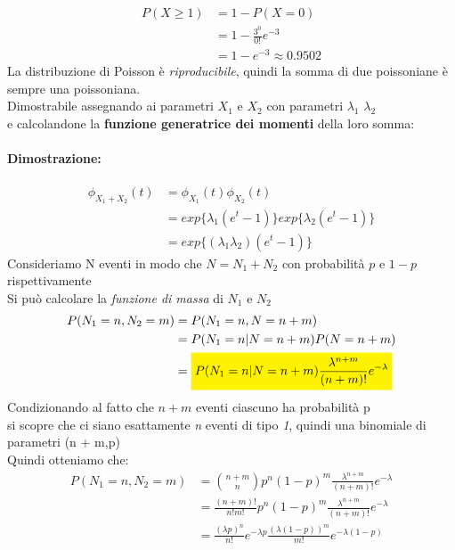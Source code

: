\documentclass[]{article}
\newcommand{\highlight}[1]{\colorbox{yellow}{$\displaystyle #1$}}
\begin{document}
    \begin{equation*}
        \begin{split}
            P(X \geq 1) &= 1 - P(X = 0)\\
            & = 1 - \frac{3^0}{0!} e^{-3} \\
            & = 1 - e^{-3} \approx 0.9502
        \end{split}
    \end{equation*}
    La distribuzione di Poisson è \textit{riproducibile}, quindi la somma di due poissoniane è sempre una poissoniana. \\
    Dimostrabile assegnando ai parametri $X_1$ e $X_2$ con parametri $\lambda_1$ $\lambda_2$ \\
    e calcolandone la \textbf{funzione generatrice dei momenti} della loro somma:
    \paragraph{Dimostrazione:}
    \begin{equation*}
        \begin{split}
            \phi_{X_1 + X_2} (t) & = \phi_{X_1}(t) \phi_{X_2}(t) \\
            & = exp\{\lambda_1 (e^t - 1)\} exp\{\lambda_2 (e^t - 1)\} \\
            & = exp\{(\lambda_1 \lambda_2) (e^t - 1)\}
        \end{split}
    \end{equation*}
    Consideriamo N eventi in modo che $N = N_1 + N_2$ con probabilità $p$ e $1 - p$ rispettivamente \\
    Si può calcolare la \textit{funzione di massa} di $N_1$ e $N_2$
    \begin{equation*}
        \begin{split}
            P(N_1 = n, N_2 = m) &= P(N_1 = n, N = n+m) \\
            & = P(N_1 = n | N = n + m) P(N = n+m) \\
            & = \highlight{P(N_1 = n | N = n + m) \frac{\lambda^{n+m}}{(n+m)!} e^{-\lambda}}
        \end{split}
    \end{equation*}
    Condizionando al fatto che $n + m$ eventi ciascuno ha probabilità p \\
    si scopre che ci siano esattamente \textit{n} eventi di tipo \textit{1}, quindi una binomiale di parametri (n + m,p) \\
    Quindi otteniamo che:
    \begin{equation*}
        \begin{split}
            P(N_1 = n, N_2 = m) &= \binom{n + m}{n} p^n (1-p)^m \frac{\lambda^{n+m}}{(n+m)!} e^{-\lambda} \\
            & = \frac{(n+m)!}{n! m!} p^n (1-p)^m \frac{\lambda^{n+m}}{(n+m)!} e^{-\lambda} \\
            & = \frac{(\lambda p)^n}{n!} e^{-\lambda p} \frac{(\lambda (1-p))^m}{m!} e^{-\lambda (1-p)}
        \end{split}
    \end{equation*}
\end{document}
